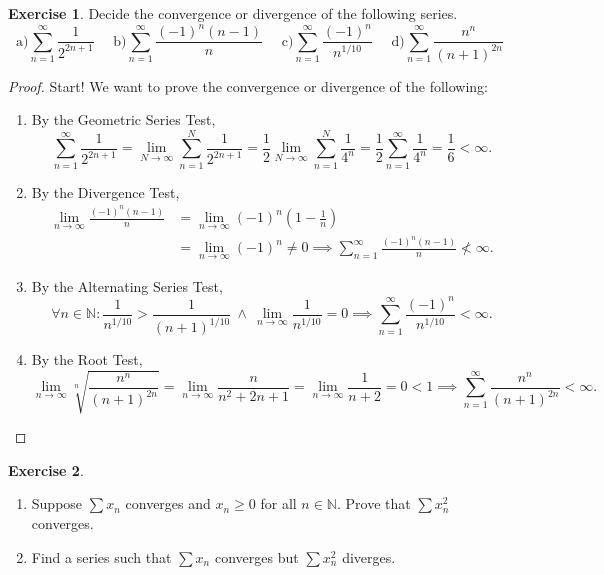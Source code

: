 \documentclass[12pt]{article}
\theoremstyle{definition}
\newtheorem{exercise}{Exercise}
\begin{document}
\begin{exercise}
    Decide the convergence or divergence of the following series.
    \[
        \text{a}) \sum_{n = 1}^{\infty}\frac{1}{2^{2n + 1}} \ \ \ \ \ \ \text{b}) \sum_{n = 1}^{\infty}\frac{(-1)^n(n - 1)}{n} \ \ \ \ \ \  \text{c}) \sum_{n = 1}^{\infty}\frac{(-1)^n}{n^{1/10}} \ \ \ \ \ \ \text{d}) \sum_{n = 1}^{\infty}\frac{n^n}{(n + 1)^{2n}}
    \]
\end{exercise}

\begin{proof}
    Start! We want to prove the convergence or divergence of the following:
    \begin{enumerate}[label=\alph*)]
        \item By the Geometric Series Test,
        \[
            \sum_{n = 1}^{\infty}\frac{1}{2^{2n + 1}} = \lim_{N \to \infty}\sum_{n = 1}^N\frac{1}{2^{2n + 1}} = \frac{1}{2}\lim_{N \to \infty}\sum_{n = 1}^{N}\frac{1}{4^n} = \frac{1}{2}\sum_{n = 1}^{\infty}\frac{1}{4^n} = \frac{1}{6} < \infty.
        \]
        \item By the Divergence Test,
        \begin{align*}
            \lim_{n \to \infty}\frac{(-1)^n(n - 1)}{n} &= \lim_{n \to \infty}(-1)^n\left(1 - \frac{1}{n}\right) \\
            &= \lim_{n \to \infty}(-1)^n \neq 0 \implies \sum_{n = 1}^{\infty}\frac{(-1)^n(n - 1)}{n} \not < \infty.
        \end{align*}
        \item By the Alternating Series Test,
        \[
            \forall n \in \mathbb{N} : \frac{1}{n^{1/10}} > \frac{1}{(n + 1)^{1 / 10}} \ \land \ \lim_{n \to \infty}\frac{1}{n^{1/10}} = 0 \implies \sum_{n = 1}^{\infty}\frac{(-1)^n}{n^{1/10}} < \infty.
        \]
        \item By the Root Test,
        \[
            \lim_{n \to \infty}\sqrt[n]{\frac{n^n}{(n + 1)^{2n}}} = \lim_{n \to \infty}\frac{n}{n^2 + 2n + 1} = \lim_{n \to \infty}\frac{1}{n + 2} = 0 < 1 \implies \sum_{n = 1}^{\infty}\frac{n^n}{(n + 1)^{2n}} < \infty.
        \]
        \end{enumerate}
\end{proof}

\begin{exercise}
    \hfill
    \begin{enumerate}[label=\alph*)]
        \item Suppose \(\sum x_n\) converges and \(x_n \geq 0\) for all \(n \in \mathbb{N}\). Prove that \(\sum x_n^2\) converges.
        \item Find a series such that \(\sum x_n\) converges but \(\sum x_n^2\) diverges.
    \end{enumerate}
\end{exercise}
\end{document}
